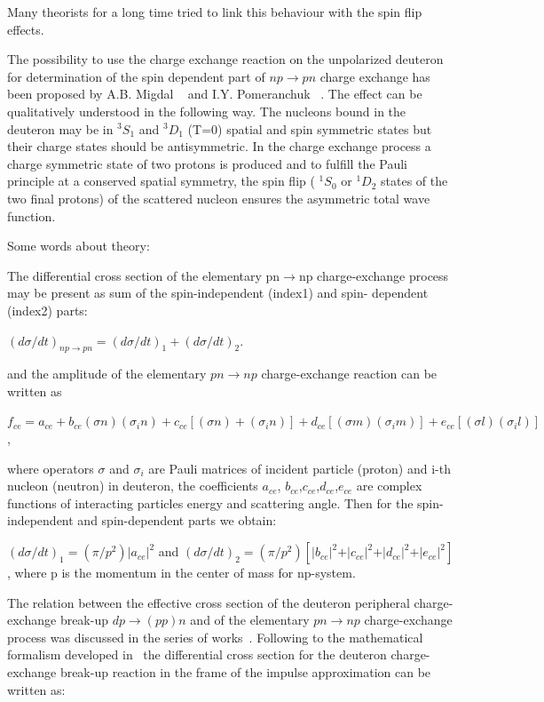 \documentclass[a4paper,12pt]{article}
\begin{document}
Many theorists for a long time tried to link this behaviour with the spin flip
effects.

The possibility to use the charge exchange reaction on the unpolarized deuteron
for determination of the spin dependent part of $np\to pn$ charge exchange has been
proposed by A.B. Migdal ~\cite{a2}  and I.Y. Pomeranchuk ~\cite{a3}. The
effect can be qualitatively understood in the following way. The nucleons bound
in the deuteron may be in $^{3}S_1$ and $^{3}D_1$ (T=0) spatial and spin
symmetric states but their charge states should be antisymmetric. In the charge
exchange process a charge symmetric state of two protons is produced and to
fulfill the Pauli principle at a conserved spatial symmetry, the spin flip (
$^{1}S_0$ or $^{1}D_2$ states of the two final protons) of the scattered nucleon
ensures the asymmetric total wave function.

Some words about theory:

The differential cross section of the elementary pn$\to$np charge-exchange
process may be present as sum of  the spin-independent (index1) and spin-
dependent (index2) parts:

$(d \sigma /dt)_{np\rightarrow pn}=(d \sigma /dt)_{1} +(d \sigma /dt)_{2}$.

and the amplitude of the elementary $pn \to np$ charge-exchange reaction can be
written as

$f_{ce}=a_{ce}+b_{ce} (\sigma n)( \sigma _{i}n) +c_{ce}[(\sigma n)+( \sigma _{i}
  n)]+d_{ce} [(\sigma m)( \sigma _{i}m)]+e_{ce} [(\sigma l)( \sigma _{i}l)]$,

where operators $\sigma $ and $\sigma _i$ are Pauli matrices of incident
particle (proton) and i-th nucleon (neutron) in deuteron, the coefficients
$a_{ce}$, $b_{ce}$,$c_{ce}$,$d_{ce}$,$e_{ce}$
are complex functions of interacting particles energy and scattering angle. Then
for the spin-independent and spin-dependent parts we obtain:

$(d \sigma /dt)_{1} = (\pi /p^{2}){\vert }a_{ce}{\vert }^{2}$
and
$(d \sigma /dt)_{2} =(\pi/p^{2})[ \vert b_{ce} \vert ^{2}+ \vert c_{ce} \vert
  ^{2}+ \vert d_{ce} \vert ^{2}+ \vert e_{ce} \vert ^{2}]$,
where p is the momentum in the center of mass for np-system.

The relation between the effective cross section of the deuteron peripheral
charge-exchange break-up $dp \to (pp)n$ and of the elementary $pn \to np$
charge-exchange process was discussed in the series of works~\cite{a4, a5, a6}.
Following to the mathematical formalism developed in~\cite{a4, a5}  the
differential cross section for the deuteron charge-exchange break-up reaction in
the frame of the impulse approximation can be written as:
\end{document}
